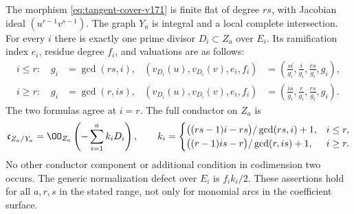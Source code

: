 \begin{theorem}
\label{thm:tangent-conductor-v171}
The morphism \eqref{eq:tangent-cover-v171} is finite flat of degree
$rs$, with Jacobian ideal $(u^{r-1}v^{s-1})$. The graph $Y_a$ is
integral and a local complete intersection. For every $i$ there is
exactly one prime divisor $D_i\subset Z_a$ over $E_i$. Its ramification
index $e_i$, residue degree $f_i$, and valuations are as follows:
\begin{align}
 i\leq r:\quad g_i&=\gcd(rs,i),&
 (v_{D_i}(u),v_{D_i}(v),e_i,f_i)
   &=\left(\frac{si}{g_i},\frac{i}{g_i},\frac{rs}{g_i},g_i\right),
 \label{eq:tangent-low-v171}\\
 i\geq r:\quad g_i&=\gcd(r,is),&
 (v_{D_i}(u),v_{D_i}(v),e_i,f_i)
   &=\left(\frac{is}{g_i},\frac{r}{g_i},\frac{rs}{g_i},g_i\right).
 \label{eq:tangent-high-v171}
\end{align}
The two formulas agree at $i=r$. The full conductor on $Z_a$ is
\begin{equation}\label{eq:tangent-conductor-v171}
 \mathfrak c_{Z_a/Y_a}=\OO_{Z_a}\left(-\sum_{i=1}^a k_iD_i\right),
 \qquad
 k_i=\begin{cases}
 \big((rs-1)i-rs\big)/\gcd(rs,i)+1,&i\leq r,\\
 \big((r-1)is-r\big)/\gcd(r,is)+1,&i\geq r.
 \end{cases}
\end{equation}
No other conductor component or additional condition in codimension
two occurs. The generic normalization defect over $E_i$ is $f_i k_i/2$.
These assertions hold for all $a,r,s$ in the stated range, not only for
monomial arcs in the coefficient surface.
\end{theorem}
